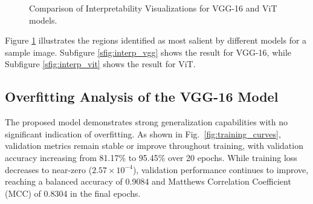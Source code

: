 \documentclass[a4paper,12pt]{report}
\begin{document}
\begin{figure}[htbp] %
    \centering %
    
    
    \caption{Comparison of Interpretability Visualizations for VGG-16 and ViT models.} %
    \label{fig:interpretability_maps} %
\end{figure}

Figure \ref{fig:interpretability_maps} illustrates the regions identified as most salient by different models for a sample image. Subfigure \ref{sfig:interp_vgg} shows the result for VGG-16, while Subfigure \ref{sfig:interp_vit} shows the result for ViT.


\subsection{Overfitting Analysis of the VGG-16 Model}


The proposed model demonstrates strong generalization capabilities with no significant indication of overfitting. As shown in Fig.~\ref{fig:training_curves}, validation metrics remain stable or improve throughout training, with validation accuracy increasing from 81.17\% to 95.45\% over 20 epochs. While training loss decreases to near-zero ($2.57 \times 10^{-4}$), validation performance continues to improve, reaching a balanced accuracy of 0.9084 and Matthews Correlation Coefficient (MCC) of 0.8304 in the final epochs.
\end{document}
